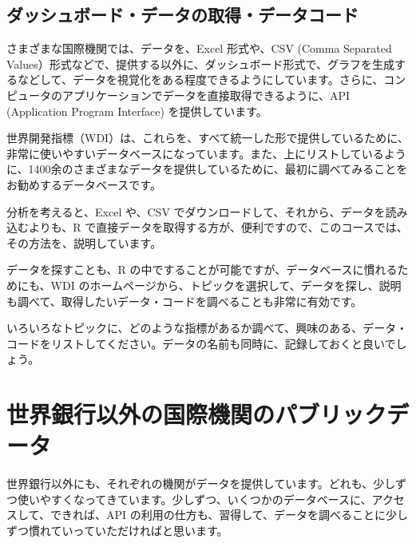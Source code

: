 \documentclass[
  xelatex, ja=standard]{bxjsbook}
\theoremstyle{definition}
\theoremstyle{definition}
\theoremstyle{definition}
\theoremstyle{definition}
\theoremstyle{remark}
\begin{document}
\hypertarget{ux30c0ux30c3ux30b7ux30e5ux30dcux30fcux30c9ux30c7ux30fcux30bfux306eux53d6ux5f97ux30c7ux30fcux30bfux30b3ux30fcux30c9}{%
\subsection{ダッシュボード・データの取得・データコード}\label{ux30c0ux30c3ux30b7ux30e5ux30dcux30fcux30c9ux30c7ux30fcux30bfux306eux53d6ux5f97ux30c7ux30fcux30bfux30b3ux30fcux30c9}}

さまざまな国際機関では、データを、Excel 形式や、CSV (Comma Separated Values）形式などで、提供する以外に、ダッシュボード形式で、グラフを生成するなどして、データを視覚化をある程度できるようにしています。さらに、コンピュータのアプリケーションでデータを直接取得できるように、API (Application Program Interface) を提供しています。

世界開発指標（WDI）は、これらを、すべて統一した形で提供しているために、非常に使いやすいデータベースになっています。また、上にリストしているように、1400余のさまざまなデータを提供しているために、最初に調べてみることをお勧めするデータベースです。

分析を考えると、Excel や、CSV でダウンロードして、それから、データを読み込むよりも、R で直接データを取得する方が、便利ですので、このコースでは、その方法を、説明しています。

データを探すことも、R の中ですることが可能ですが、データベースに慣れるためにも、WDI のホームページから、トピックを選択して、データを探し、説明も調べて、取得したいデータ・コードを調べることも非常に有効です。

いろいろなトピックに、どのような指標があるか調べて、興味のある、データ・コードをリストしてください。データの名前も同時に、記録しておくと良いでしょう。

\hypertarget{ux4e16ux754cux9280ux884cux4ee5ux5916ux306eux56fdux969bux6a5fux95a2ux306eux30d1ux30d6ux30eaux30c3ux30afux30c7ux30fcux30bf}{%
\section{世界銀行以外の国際機関のパブリックデータ}\label{ux4e16ux754cux9280ux884cux4ee5ux5916ux306eux56fdux969bux6a5fux95a2ux306eux30d1ux30d6ux30eaux30c3ux30afux30c7ux30fcux30bf}}

世界銀行以外にも、それぞれの機関がデータを提供しています。どれも、少しずつ使いやすくなってきています。少しずつ、いくつかのデータベースに、アクセスして、できれば、API の利用の仕方も、習得して、データを調べることに少しずつ慣れていっていただければと思います。
\end{document}
